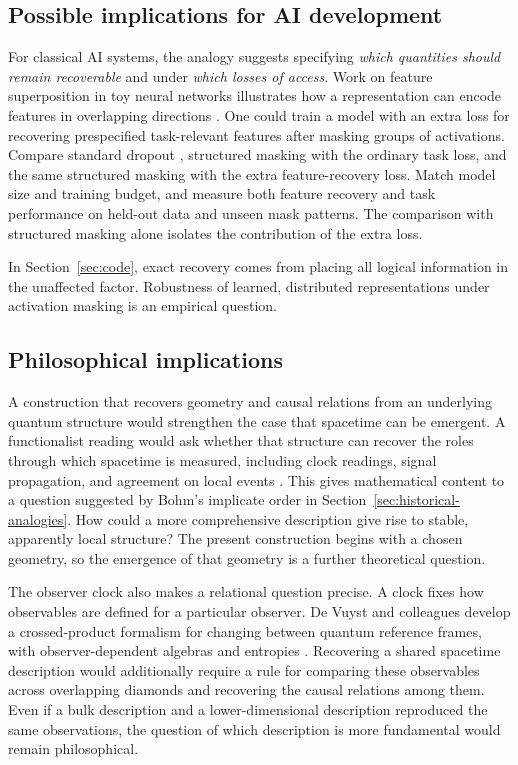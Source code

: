 \documentclass[11pt,a4paper]{article}
\numberwithin{equation}{section}
\theoremstyle{remark}
\begin{document}
\subsection{Possible implications for AI development}

For classical AI systems, the analogy suggests specifying \emph{which quantities should remain recoverable} and under \emph{which losses of access}. Work on feature superposition in toy neural networks illustrates how a representation can encode features in overlapping directions \cite{Elhage2022}. One could train a model with an extra loss for recovering prespecified task-relevant features after masking groups of activations. Compare standard dropout \cite{SrivastavaEtAl2014}, structured masking with the ordinary task loss, and the same structured masking with the extra feature-recovery loss. Match model size and training budget, and measure both feature recovery and task performance on held-out data and unseen mask patterns. The comparison with structured masking alone isolates the contribution of the extra loss.

In Section~\ref{sec:code}, exact recovery comes from placing all logical information in the unaffected factor. Robustness of learned, distributed representations under activation masking is an empirical question.

\subsection{Philosophical implications}

A construction that recovers geometry and causal relations from an underlying quantum structure would strengthen the case that spacetime can be emergent. A functionalist reading would ask whether that structure can recover the roles through which spacetime is measured, including clock readings, signal propagation, and agreement on local events \cite{LamWuthrich2018}. This gives mathematical content to a question suggested by Bohm's implicate order in Section~\ref{sec:historical-analogies}. How could a more comprehensive description give rise to stable, apparently local structure? The present construction begins with a chosen geometry, so the emergence of that geometry is a further theoretical question.

The observer clock also makes a relational question precise. A clock fixes how observables are defined for a particular observer. De Vuyst and colleagues develop a crossed-product formalism for changing between quantum reference frames, with observer-dependent algebras and entropies \cite{DeVuystEtAl2025}. Recovering a shared spacetime description would additionally require a rule for comparing these observables across overlapping diamonds and recovering the causal relations among them. Even if a bulk description and a lower-dimensional description reproduced the same observations, the question of which description is more fundamental would remain philosophical.
\end{document}
